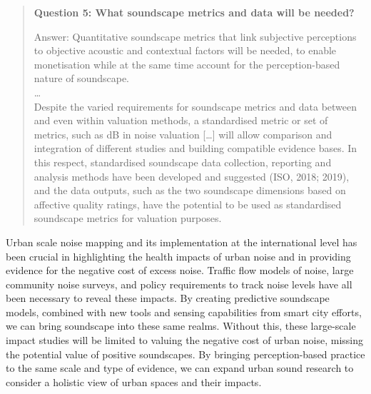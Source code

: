 \begin{quote}
  \textbf{Question 5: What soundscape metrics and data will be needed?}

  Answer: Quantitative soundscape metrics that link subjective perceptions to objective acoustic and contextual factors will be needed, to enable monetisation while at the same time account for the perception-based nature of soundscape.\\
 \ldots\\
Despite the varied requirements for soundscape metrics and data between and even within valuation methods, a standardised metric or set of metrics, such as dB in noise valuation [\ldots] will allow comparison and integration of different studies and building compatible evidence bases. In this respect, standardised soundscape data collection, reporting and analysis methods have been developed and suggested (ISO, 2018; 2019), and the data outputs, such as the two soundscape dimensions based on affective quality ratings, have the potential to be used as standardised soundscape metrics for valuation purposes.

  \begin{flushright}
    \citet{Jiang2022Ten}
  \end{flushright}
\end{quote}

Urban scale noise mapping and its implementation at the international level has been crucial in highlighting the health impacts of urban noise and in providing evidence for the negative cost of excess noise. Traffic flow models of noise, large community noise surveys, and policy requirements to track noise levels have all been necessary to reveal these impacts. By creating predictive soundscape models, combined with new tools and sensing capabilities from smart city efforts, we can bring soundscape into these same realms. Without this, these large-scale impact studies will be limited to valuing the negative cost of urban noise, missing the potential value of positive soundscapes. By bringing perception-based practice to the same scale and type of evidence, we can expand urban sound research to consider a holistic view of urban spaces and their impacts.


